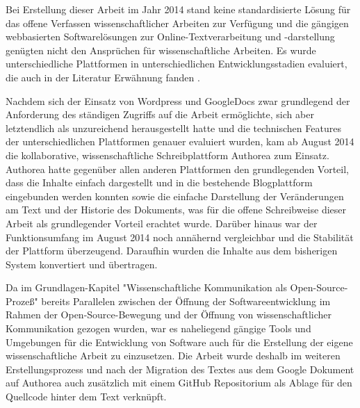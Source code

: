 Bei Erstellung dieser Arbeit im Jahr 2014 stand keine standardisierte Lösung für das offene Verfassen wissenschaftlicher Arbeiten zur Verfügung und die gängigen webbasierten Softwarelösungen zur Online-Textverarbeitung und -darstellung genügten nicht den Ansprüchen für wissenschaftliche Arbeiten. Es wurde unterschiedliche Plattformen in unterschiedlichen Entwicklungsstadien evaluiert, die auch in der Literatur Erwähnung fanden \cite{Perkel_2014}.

Nachdem sich der Einsatz von Wordpress und GoogleDocs zwar grundlegend der Anforderung des ständigen Zugriffs auf die Arbeit ermöglichte, sich aber letztendlich als unzureichend herausgestellt hatte und die technischen Features der unterschiedlichen Plattformen genauer evaluiert wurden, kam ab August 2014 die kollaborative, wissenschaftliche Schreibplattform Authorea zum Einsatz. Authorea hatte gegenüber allen anderen Plattformen den grundlegenden Vorteil, dass die Inhalte einfach dargestellt und in die bestehende Blogplattform eingebunden werden konnten sowie die einfache Darstellung der Veränderungen am Text und der Historie des Dokuments, was für die offene Schreibweise dieser Arbeit als grundlegender Vorteil erachtet wurde. Darüber hinaus war der Funktionsumfang im August 2014 noch annähernd vergleichbar und die Stabilität der Plattform überzeugend. Daraufhin wurden die Inhalte aus dem bisherigen System konvertiert und übertragen.

Da im Grundlagen-Kapitel "Wissenschaftliche Kommunikation als Open-Source-Prozeß" bereits Parallelen zwischen der Öffnung der Softwareentwicklung im Rahmen der Open-Source-Bewegung und der Öffnung von wissenschaftlicher Kommunikation gezogen wurden, war es naheliegend gängige Tools und Umgebungen für die Entwicklung von Software auch für die Erstellung der eigene wissenschaftliche Arbeit zu einzusetzen. Die Arbeit wurde deshalb im weiteren Erstellungsprozess und nach der Migration des Textes aus dem Google Dokument auf Authorea auch zusätzlich mit einem GitHub Repositorium als Ablage für den Quellcode hinter dem Text verknüpft.

